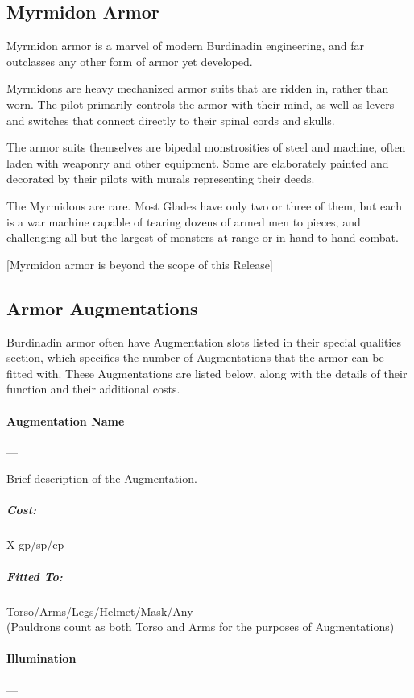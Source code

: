 \documentclass[oneside,11pt,english]{book}
\begin{document}
\subsection{Myrmidon Armor}
Myrmidon armor is a marvel of modern Burdinadin engineering, and far outclasses any other form of 
armor yet developed.

Myrmidons are heavy mechanized armor suits that are ridden in, rather than worn. The pilot primarily 
controls the armor with their mind, as well as levers and switches that connect directly to their spinal 
cords and skulls.

The armor suits themselves are bipedal monstrosities of steel and machine, often laden with weaponry 
and other equipment. Some are elaborately painted and decorated by their pilots with murals representing 
their deeds.

The Myrmidons are rare. Most Glades have only two or three of them, but each is a war machine capable 
of tearing dozens of armed men to pieces, and challenging all but the largest of monsters at range or in 
hand to hand combat. 

[Myrmidon armor is beyond the scope of this Release] 

\subsection{Armor Augmentations}
Burdinadin armor often have Augmentation slots listed in their special qualities section, which specifies 
the number of Augmentations that the armor can be fitted with. These Augmentations are listed below,
along with the details of their function and their additional costs.

\paragraph{Augmentation Name}---

Brief description of the Augmentation.
\vspace{-15pt}\subparagraph{Cost:} X gp/sp/cp
\vspace{-15pt}\subparagraph{Fitted To:} Torso/Arms/Legs/Helmet/Mask/Any\\ (Pauldrons count as both Torso and Arms for the purposes of Augmentations)

\paragraph{Illumination}---\quad[0]
\end{document}
